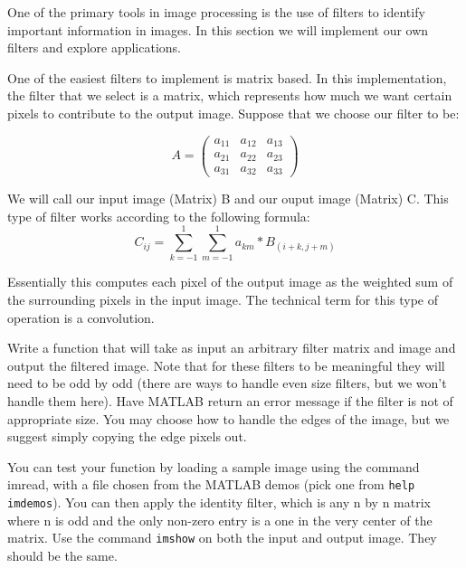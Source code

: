 

One of the primary tools in image processing is the use of filters to identify important information in images. In this section we will implement our own filters and explore applications.

One of the easiest filters to implement is matrix based. In this implementation, the filter that we select is a matrix, which represents how much we want certain pixels to contribute to the output image. Suppose that we choose our filter to be:

\[
A = \begin{pmatrix}
a_{11}&a_{12}&a_{13}\\
a_{21}&a_{22}&a_{23}\\
a_{31}&a_{32}&a_{33}
\end{pmatrix}
\]

We will call our input image (Matrix) B and our ouput image (Matrix) C. This type of filter works according to the following formula:
\[
C_{ij} = \sum_{k=-1}^1 \sum_{m=-1}^1 a_{km}*B_{(i+k,j+m)}
\]

Essentially this computes each pixel of the output image as the weighted sum of the surrounding pixels in the input image. The technical term for this type of operation is a convolution.

\begin{problem}
Write a function that will take as input an arbitrary filter matrix and image and output the filtered image. Note that for these filters to be meaningful they will need to be odd by odd (there are ways to handle even size filters, but we won't handle them here). Have MATLAB return an error message if the filter is not of appropriate size. You may choose how to handle the edges of the image, but we suggest simply copying the edge pixels out.

You can test your function by loading a sample image using the command imread, with a file chosen from the MATLAB demos (pick one from {\tt help imdemos}). You can then apply the identity filter, which is any n by n matrix where n is odd and the only non-zero entry is a one in the very center of the matrix. Use the command {\tt imshow} on both the input and output image. They should be the same.
\end{problem}


